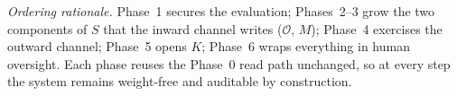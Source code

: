 \noindent\emph{Ordering rationale.} Phase~1 secures the evaluation;
Phases~2--3 grow the two components of $S$ that the inward channel writes ($\mathcal{O}$,
$M$); Phase~4 exercises the outward channel; Phase~5 opens $K$; Phase~6 wraps
everything in human oversight. Each phase reuses the Phase~0 read path unchanged,
so at every step the system remains weight-free and auditable by construction.
